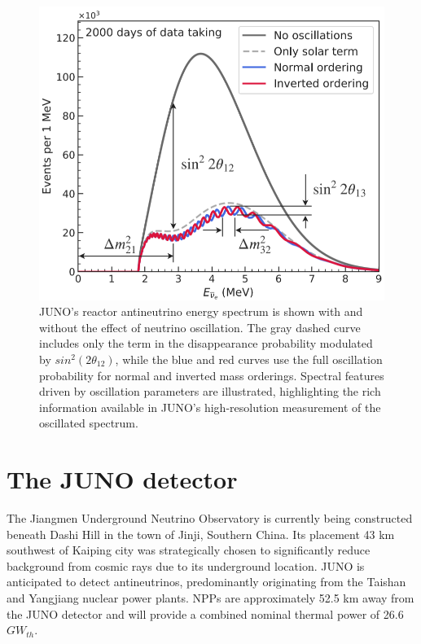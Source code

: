 \begin{figure}[h]
	\begin{minipage}{.4\textwidth}
		\caption{JUNO's reactor antineutrino energy spectrum is shown with and without the effect of neutrino oscillation. The gray dashed curve includes only the term in the disappearance probability modulated by $sin^2(2\theta_{12})$, while the blue and red curves use the full oscillation probability for normal and inverted mass orderings. Spectral features driven by oscillation parameters are illustrated, highlighting the rich information available in JUNO's high-resolution measurement of the oscillated spectrum. \cite{Sub_osci}}
		\label{fig:antineutinotoantineutrinoprobabilityplot}
	\end{minipage}%
	\hspace{1cm}
	\begin{minipage}{.5\textwidth}
		\includegraphics[width=\linewidth]{Images/antineutino_to_antineutrino_probability_plot}
	\end{minipage}
\end{figure}

\newpage




\section{The JUNO detector}
The Jiangmen Underground Neutrino Observatory is currently being constructed beneath Dashi Hill in the town of Jinji, Southern China. Its placement 43 km southwest of Kaiping city was strategically chosen to significantly reduce background  from cosmic rays due to its underground location. JUNO is anticipated to detect antineutrinos, predominantly originating from the Taishan and Yangjiang nuclear power plants. NPPs are approximately 52.5 km away from the JUNO detector and will provide a combined nominal thermal power of 26.6 $GW_{th}$.\\

